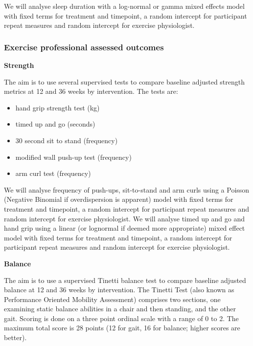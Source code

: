\documentclass[
]{article}
\begin{document}
We will analyse sleep duration with a log-normal or gamma mixed effects model with fixed terms for treatment and timepoint, a random intercept for participant repeat measures and random intercept for exercise physiologist.


\hypertarget{exercise-professional-assessed-outcomes}{%
  \subsubsection{Exercise professional assessed outcomes}\label{exercise-professional-assessed-outcomes}}



\textbf{Strength}

The aim is to use several supervised tests to compare baseline adjusted strength metrics at 12 and 36 weeks by intervention.
The tests are:

\begin{itemize}
  \item hand grip strength test (kg)
  \item timed up and go (seconds)
  \item 30 second sit to stand (frequency)
  \item modified wall push-up test (frequency)
  \item arm curl test (frequency)

\end{itemize}

We will analyse frequency of push-ups, sit-to-stand and arm curls using a Poisson (Negative Binomial if overdispersion is apparent) model with fixed terms for treatment and timepoint, a random intercept for participant repeat measures and random intercept for exercise physiologist.
We will analyse timed up and go and hand grip using a linear (or lognormal if deemed more appropriate) mixed effect model with fixed terms for treatment and timepoint, a random intercept for participant repeat measures and random intercept for exercise physiologist.

\textbf{Balance}

The aim is to use a supervised Tinetti balance test to compare baseline adjusted balance at 12 and 36 weeks by intervention.
The Tinetti Test (also known as Performance Oriented Mobility Assessment) comprises two sections, one examining static balance abilities in a chair and then standing, and the other gait.
Scoring is done on a three point ordinal scale with a range of 0 to 2.
The maximum total score is 28 points (12 for gait, 16 for balance; higher scores are better).
\end{document}
